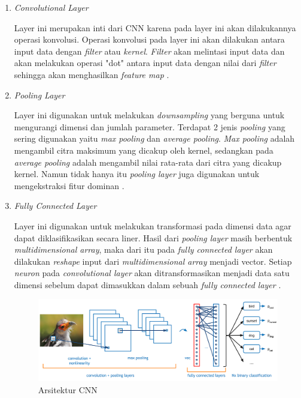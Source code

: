 \begin{enumerate}
  \item \textit{Convolutional Layer} \par
  Layer ini merupakan inti dari CNN karena pada layer ini akan dilakukannya operasi konvolusi. Operasi konvolusi pada layer ini akan dilakukan antara input data dengan \textit{filter} atau \textit{kernel}. \textit{Filter} akan melintasi input data dan akan melakukan operasi "dot" antara input data dengan nilai dari \textit{filter} sehingga akan menghasilkan \textit{feature map} \parencite{LinaQ}.
  
  \item \textit{Pooling Layer} \par
  Layer ini digunakan untuk melakukan \textit{downsampling} yang berguna untuk mengurangi dimensi dan jumlah parameter. Terdapat 2 jenis \textit{pooling} yang sering digunakan yaitu \textit{max pooling} dan  \textit{average pooling}. \textit{Max pooling} adalah mengambil citra maksimum yang dicakup oleh kernel, sedangkan pada \textit{average pooling} adalah mengambil nilai rata-rata dari citra yang dicakup kernel.
  Namun tidak hanya itu \textit{pooling layer} juga digunakan untuk mengekstraksi fitur dominan \parencite{Bukusakti}. 

  \item \textit{Fully Connected Layer} \par
  Layer ini digunakan untuk melakukan transformasi pada dimensi data agar dapat diklasifikasikan secara liner.
  Hasil dari \textit{pooling layer} masih berbentuk \textit{multidimensional array}, maka dari itu pada \textit{fully connected layer} akan dilakukan \textit{reshape} input dari \textit{multidimensional array} menjadi vector. Setiap \textit{neuron} pada \textit{convolutional layer} akan ditransformasikan menjadi data satu dimensi sebelum dapat dimasukkan dalam sebuah \textit{fully connected layer} \parencite{JurnalTeknikITS}.

  \begin{figure}[!h]
    \centering
    \includegraphics[width=1\linewidth]{gambar/cnn.png}
    \caption{Arsitektur CNN \parencite{adit}}
    \label{fig:cnn}
  \end{figure}

\end{enumerate} 

